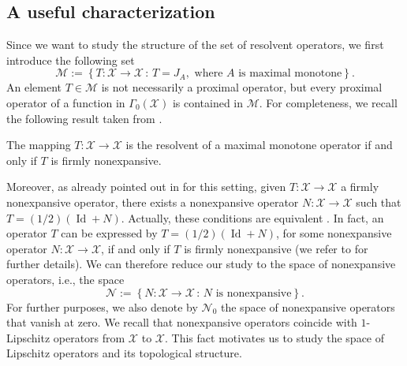 \documentclass[onefignum,onetabnum]{siamonline250211}
\newcommand{\Id}{\operatorname{Id}}
\newcommand{\M}{\mathcal{M}}
\newcommand{\cX}{\mathcal{X}}
\begin{document}
\subsection{A useful characterization}\label{sec:charac}
Since we want to study the structure of the set of resolvent operators,
we first introduce the following set
\begin{equation}\label{eq:fnespace}
\M:=\left\{T:\cX\to\cX \, : \, T=J_{A}, \text{ where } A \text{ is maximal monotone}\right\}.
\end{equation}
An element $T\in\M$ is not necessarily a proximal operator, but every proximal operator of a function in $\Gamma_0(\cX)$ is contained in $\M$. For completeness, we recall the following result taken from \cite[Corollary 23.9]{BCombettes}. 
\begin{lemma}\label{lem:fneequivmm}
The mapping $T:\cX\to\cX$ is the resolvent of a maximal monotone operator if and only if $T$ is firmly nonexpansive.
\end{lemma}
Moreover, as already pointed out in \cite{pescterr2021} for this setting, given $T:\cX\to\cX$ a firmly nonexpansive operator, there exists a nonexpansive operator $N:\cX\to\cX$ such that $T=(1/2)(\Id+N)$. Actually, these conditions are equivalent \cite[Proposition 4.4]{BCombettes}. In fact, an operator $T$ can be expressed by $T=(1/2)(\Id+N)$, for some nonexpansive operator $N:\cX\to\cX$, if and only if $T$ is firmly nonexpansive (we refer to \cite{BCombettes} for further details). We can therefore reduce our study to the space of nonexpansive operators, i.e., the space
\begin{equation}\label{eq:nonexpspace}
\mathcal{N}:=\left\{N\colon \cX\to\cX \, : \, N \text{ is nonexpansive}\right\}.
\end{equation}
For further purposes, we also denote by $\mathcal{N}_0$ the space of nonexpansive operators that vanish at zero. We recall that nonexpansive operators coincide with $1$-Lipschitz operators from $\cX$ to $\cX$. This fact motivates us to study the space of Lipschitz operators and its topological structure.
\end{document}
